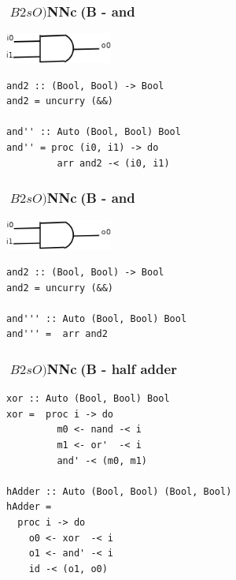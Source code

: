 \documentclass[cjk,dvipdfm,12pt]{beamer}
\begin{document}
\begin{frame}[fragile]
\frametitle{$B2sO)$NNc(B - and}

\includegraphics[height=1cm]{./And0.png}\\


\begin{lstlisting}
and2 :: (Bool, Bool) -> Bool
and2 = uncurry (&&)

and'' :: Auto (Bool, Bool) Bool
and'' = proc (i0, i1) -> do
         arr and2 -< (i0, i1)
\end{lstlisting}

\end{frame}

\begin{frame}[fragile]
\frametitle{$B2sO)$NNc(B - and}

\includegraphics[height=1cm]{./And0.png}\\


\begin{lstlisting}
and2 :: (Bool, Bool) -> Bool
and2 = uncurry (&&)

and''' :: Auto (Bool, Bool) Bool
and''' =  arr and2
\end{lstlisting}

\end{frame}

\begin{frame}[fragile]
\frametitle{$B2sO)$NNc(B - half adder}

\begin{lstlisting}
xor :: Auto (Bool, Bool) Bool
xor =  proc i -> do
         m0 <- nand -< i 
         m1 <- or'  -< i
         and' -< (m0, m1)

hAdder :: Auto (Bool, Bool) (Bool, Bool)
hAdder =  
  proc i -> do
    o0 <- xor  -< i
    o1 <- and' -< i
    id -< (o1, o0)
\end{lstlisting}
\end{frame}

\begin{frame}


\end{frame}

\begin{frame}
\end{frame}
\end{document}

